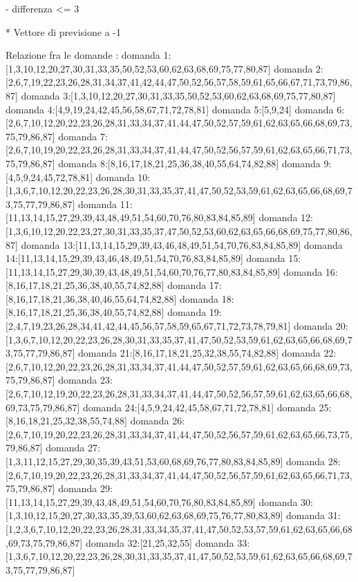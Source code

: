 - differenza <= 3

* Vettore di previsione a -1

Relazione fra le domande :
domanda 1:[1,3,10,12,20,27,30,31,33,35,50,52,53,60,62,63,68,69,75,77,80,87]
domanda 2:[2,6,7,19,22,23,26,28,31,34,37,41,42,44,47,50,52,56,57,58,59,61,65,66,67,71,73,79,86,87]
domanda 3:[1,3,10,12,20,27,30,31,33,35,50,52,53,60,62,63,68,69,75,77,80,87]
domanda 4:[4,9,19,24,42,45,56,58,67,71,72,78,81]
domanda 5:[5,9,24]
domanda 6:[2,6,7,10,12,20,22,23,26,28,31,33,34,37,41,44,47,50,52,57,59,61,62,63,65,66,68,69,73,75,79,86,87]
domanda 7:[2,6,7,10,19,20,22,23,26,28,31,33,34,37,41,44,47,50,52,56,57,59,61,62,63,65,66,71,73,75,79,86,87]
domanda 8:[8,16,17,18,21,25,36,38,40,55,64,74,82,88]
domanda 9:[4,5,9,24,45,72,78,81]
domanda 10:[1,3,6,7,10,12,20,22,23,26,28,30,31,33,35,37,41,47,50,52,53,59,61,62,63,65,66,68,69,73,75,77,79,86,87]
domanda 11:[11,13,14,15,27,29,39,43,48,49,51,54,60,70,76,80,83,84,85,89]
domanda 12:[1,3,6,10,12,20,22,23,27,30,31,33,35,37,47,50,52,53,60,62,63,65,66,68,69,75,77,80,86,87]
domanda 13:[11,13,14,15,29,39,43,46,48,49,51,54,70,76,83,84,85,89]
domanda 14:[11,13,14,15,29,39,43,46,48,49,51,54,70,76,83,84,85,89]
domanda 15:[11,13,14,15,27,29,30,39,43,48,49,51,54,60,70,76,77,80,83,84,85,89]
domanda 16:[8,16,17,18,21,25,36,38,40,55,74,82,88]
domanda 17:[8,16,17,18,21,36,38,40,46,55,64,74,82,88]
domanda 18:[8,16,17,18,21,25,36,38,40,55,74,82,88]
domanda 19:[2,4,7,19,23,26,28,34,41,42,44,45,56,57,58,59,65,67,71,72,73,78,79,81]
domanda 20:[1,3,6,7,10,12,20,22,23,26,28,30,31,33,35,37,41,47,50,52,53,59,61,62,63,65,66,68,69,73,75,77,79,86,87]
domanda 21:[8,16,17,18,21,25,32,38,55,74,82,88]
domanda 22:[2,6,7,10,12,20,22,23,26,28,31,33,34,37,41,44,47,50,52,57,59,61,62,63,65,66,68,69,73,75,79,86,87]
domanda 23:[2,6,7,10,12,19,20,22,23,26,28,31,33,34,37,41,44,47,50,52,56,57,59,61,62,63,65,66,68,69,73,75,79,86,87]
domanda 24:[4,5,9,24,42,45,58,67,71,72,78,81]
domanda 25:[8,16,18,21,25,32,38,55,74,88]
domanda 26:[2,6,7,10,19,20,22,23,26,28,31,33,34,37,41,44,47,50,52,56,57,59,61,62,63,65,66,73,75,79,86,87]
domanda 27:[1,3,11,12,15,27,29,30,35,39,43,51,53,60,68,69,76,77,80,83,84,85,89]
domanda 28:[2,6,7,10,19,20,22,23,26,28,31,33,34,37,41,44,47,50,52,56,57,59,61,62,63,65,66,71,73,75,79,86,87]
domanda 29:[11,13,14,15,27,29,39,43,48,49,51,54,60,70,76,80,83,84,85,89]
domanda 30:[1,3,10,12,15,20,27,30,33,35,39,53,60,62,63,68,69,75,76,77,80,83,89]
domanda 31:[1,2,3,6,7,10,12,20,22,23,26,28,31,33,34,35,37,41,47,50,52,53,57,59,61,62,63,65,66,68,69,73,75,79,86,87]
domanda 32:[21,25,32,55]
domanda 33:[1,3,6,7,10,12,20,22,23,26,28,30,31,33,35,37,41,47,50,52,53,59,61,62,63,65,66,68,69,73,75,77,79,86,87]
